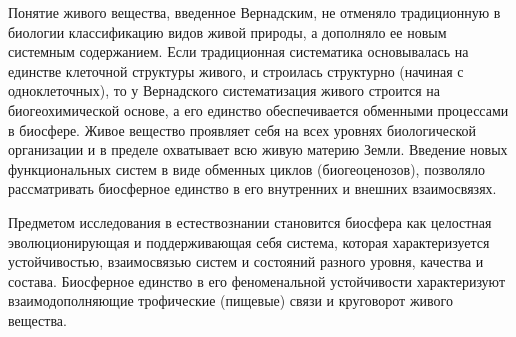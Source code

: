 \documentclass[exam_answers.tex]{subfiles}
\begin{document}
Понятие живого вещества, введенное Вернадским, не отменяло
традиционную в биологии классификацию видов живой природы, а дополняло
ее новым системным содержанием. Если традиционная систематика
основывалась на единстве клеточной структуры живого, и строилась
структурно (начиная с одноклеточных), то у Вернадского систематизация
живого строится на биогеохимической основе, а его единство обеспечивается
обменными процессами в биосфере. Живое вещество проявляет себя на всех
уровнях биологической организации и в пределе охватывает всю живую
материю Земли. Введение новых функциональных систем в виде обменных
циклов (биогеоценозов), позволяло рассматривать биосферное единство в его
внутренних и внешних взаимосвязях.

Предметом исследования в естествознании становится биосфера как
целостная эволюционирующая и поддерживающая себя система, которая
характеризуется устойчивостью, взаимосвязью систем и состояний разного
уровня, качества и состава. Биосферное единство в его феноменальной
устойчивости характеризуют взаимодополняющие трофические (пищевые)
связи и круговорот живого вещества. 
\end{document}

